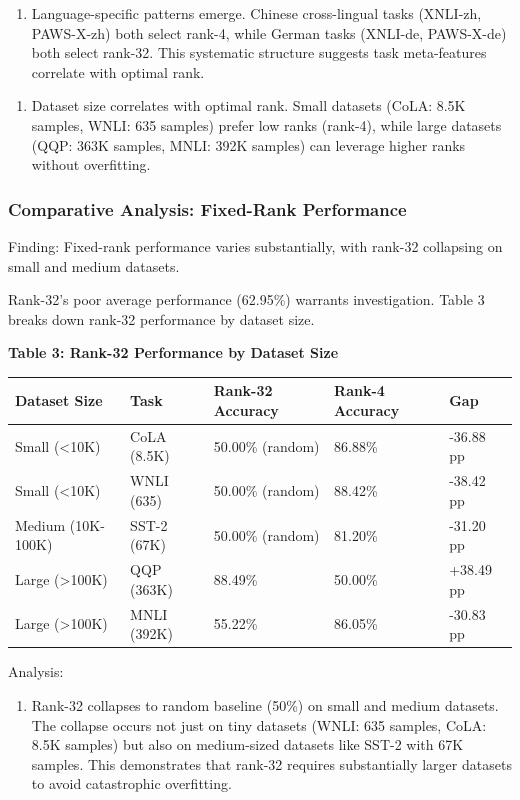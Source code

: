 \begin{enumerate}
\item Language-specific patterns emerge. Chinese cross-lingual tasks (XNLI-zh, PAWS-X-zh) both select rank-4, while German tasks (XNLI-de, PAWS-X-de) both select rank-32. This systematic structure suggests task meta-features correlate with optimal rank.
\end{enumerate}

\begin{enumerate}
\item Dataset size correlates with optimal rank. Small datasets (CoLA: 8.5K samples, WNLI: 635 samples) prefer low ranks (rank-4), while large datasets (QQP: 363K samples, MNLI: 392K samples) can leverage higher ranks without overfitting.
\end{enumerate}

\subsubsection{Comparative Analysis: Fixed-Rank Performance}

Finding: Fixed-rank performance varies substantially, with rank-32 collapsing on small and medium datasets.

Rank-32's poor average performance (62.95\%) warrants investigation. Table 3 breaks down rank-32 performance by dataset size.

\textbf{Table 3: Rank-32 Performance by Dataset Size}

\begin{table}[htbp]
\centering
\begin{tabular}{lllll}
\toprule
Dataset Size & Task & Rank-32 Accuracy & Rank-4 Accuracy & Gap \\
\midrule
Small (<10K) & CoLA (8.5K) & 50.00\% (random) & 86.88\% & -36.88 pp \\
Small (<10K) & WNLI (635) & 50.00\% (random) & 88.42\% & -38.42 pp \\
Medium (10K-100K) & SST-2 (67K) & 50.00\% (random) & 81.20\% & -31.20 pp \\
Large (>100K) & QQP (363K) & 88.49\% & 50.00\% & +38.49 pp \\
Large (>100K) & MNLI (392K) & 55.22\% & 86.05\% & -30.83 pp \\
\bottomrule
\end{tabular}
\end{table}

Analysis:

\begin{enumerate}
\item Rank-32 collapses to random baseline (50\%) on small and medium datasets. The collapse occurs not just on tiny datasets (WNLI: 635 samples, CoLA: 8.5K samples) but also on medium-sized datasets like SST-2 with 67K samples. This demonstrates that rank-32 requires substantially larger datasets to avoid catastrophic overfitting.
\end{enumerate}

